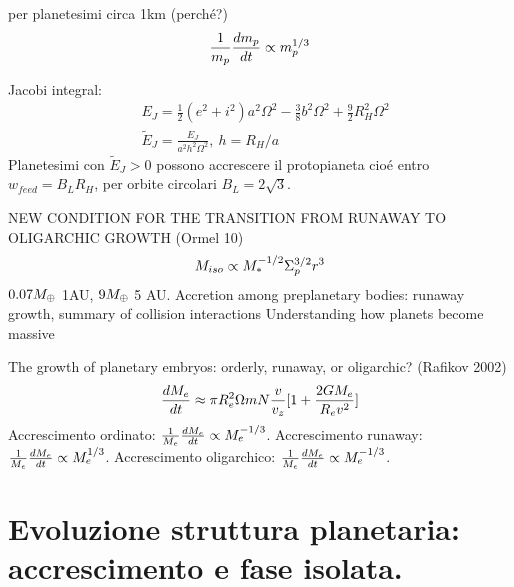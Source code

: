 \begin{workout}
per planetesimi circa 1km (perch\'e?)
\begin{equation}
\frac{1}{m_p}\TDy{t}{m_p}\propto m_p\expy{1/3}
\end{equation}
\end{workout}

\begin{workout}
Jacobi integral:
\begin{align}
&E_J=\frac{1}{2}(e^2+i^2)a^2\Omega^2-\frac{3}{8}b^2\Omega^2+\frac{9}{2}R_H^2\Omega^2\\
&\tilde{E}_J=\frac{E_J}{a^2h^2\Omega^2},\ h=R_H/a
\end{align}
Planetesimi con $\tilde{E}_J>0$ possono accrescere il protopianeta  cio\'e entro $w_{feed}=B_LR_H$, per orbite circolari $B_L=2\sqrt{3 }$.
\end{workout}

\begin{workout}
 NEW CONDITION FOR THE TRANSITION FROM RUNAWAY TO OLIGARCHIC GROWTH (Ormel 10)
 \begin{equation}
M_{iso}\propto M_*\expy{-1/2}\Sigma_p\expy{3/2}r^3
\end{equation}
$0.07\mearth{}$ 1AU, $9\mearth{}$ 5 AU.
Accretion among preplanetary bodies: runaway growth, summary of collision interactions
Understanding how planets become massive
\end{workout}
  
\begin{workout}
The growth of planetary embryos:  orderly, runaway, or oligarchic? (Rafikov 2002)
\begin{align}
\TDy{t}{M_e}\approx\pi R_e^2\Omega mN\frac{v}{v_z}[1+\frac{2GM_e}{R_ev^2}]
\end{align}
Accrescimento ordinato: $\frac{1}{M_e}\TDy{t}{M_e}\propto M_e\expy{-1/3}$. Accrescimento runaway: $\frac{1}{M_e}\TDy{t}{M_e}\propto M_e\expy{1/3}$. Accrescimento oligarchico: $\frac{1}{M_e}\TDy{t}{M_e}\propto M_e\expy{-1/3}$.
\end{workout}

\begin{workout}

\end{workout}


{\let\clearpage\relax\let\cleardoublepage\relax
\chapter{Evoluzione struttura planetaria: accrescimento e fase isolata.}
}

